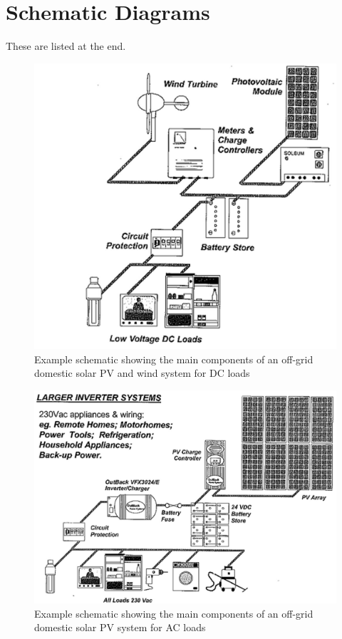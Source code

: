 \documentclass[article]{standalone}
\begin{document}
\section{Schematic Diagrams}\label{sec:schematics}
These are listed at the end.

\begin{figure}
\centering
\includegraphics[width=0.9\linewidth]{../figures/solarwindDC.jpg}
\caption{Example schematic showing the main components of an off-grid domestic solar PV and wind system for DC loads}
\label{fig:solarwindDC}
\end{figure}


\begin{figure}
\centering
\includegraphics[width=0.9\linewidth]{../figures/large-off-grid-solar-PV-AC.jpg}
\caption{Example schematic showing the main components of an off-grid domestic solar PV system for AC loads}
\label{fig:solarAC}
\end{figure}
\end{document}
